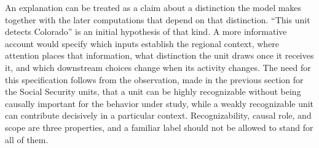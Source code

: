 \documentclass[11pt]{article}
\begin{document}
An explanation can be treated as a claim about a distinction the model makes together with the later computations that depend on that distinction. ``This unit detects Colorado'' is an initial hypothesis of that kind. A more informative account would specify which inputs establish the regional context, where attention places that information, what distinction the unit draws once it receives it, and which downstream choices change when its activity changes. The need for this specification follows from the observation, made in the previous section for the Social Security units, that a unit can be highly recognizable without being causally important for the behavior under study, while a weakly recognizable unit can contribute decisively in a particular context. Recognizability, causal role, and scope are three properties, and a familiar label should not be allowed to stand for all of them.
\end{document}
